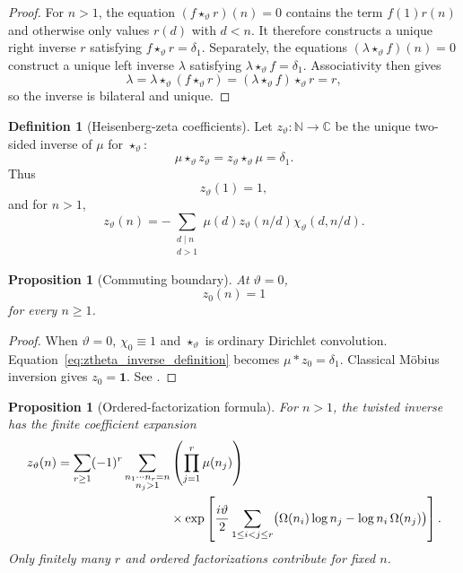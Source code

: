 \documentclass[11pt]{amsart}
\numberwithin{equation}{section}
\theoremstyle{plain}
\newtheorem{proposition}[theorem]{Proposition}
\theoremstyle{definition}
\newtheorem{definition}[theorem]{Definition}
\theoremstyle{remark}
\newcommand{\C}{\mathbb{C}}
\newcommand{\N}{\mathbb{N}}
\newcommand{\twconv}{\star_{\vartheta}}
\newcommand{\deltaone}{\delta_{1}}
\newcommand{\ellft}{\lambda}
\begin{document}
\begin{proof}
For $n>1$, the equation $(f\twconv r)(n)=0$ contains the term
$f(1)r(n)$ and otherwise only values $r(d)$ with $d<n$.  It therefore
constructs a unique right inverse $r$ satisfying $f\twconv r=\deltaone$.
Separately, the equations $(\ellft\twconv f)(n)=0$ construct a unique left
inverse $\ellft$ satisfying $\ellft\twconv f=\deltaone$.  Associativity
then gives
\begin{equation}
\ellft
=\ellft\twconv(f\twconv r)
=(\ellft\twconv f)\twconv r
=r,
\label{eq:left_right_inverse_coincide}
\end{equation}
so the inverse is bilateral and unique.
\end{proof}

\begin{definition}[Heisenberg-zeta coefficients]
\label{def:heisenberg_zeta_coefficients}
Let $z_{\vartheta}:\N\to\C$ be the unique two-sided inverse of $\mu$ for
$\twconv$:
\begin{equation}
\mu\twconv z_{\vartheta}
=
z_{\vartheta}\twconv\mu
=
\deltaone.
\label{eq:ztheta_inverse_definition}
\end{equation}
Thus
\begin{equation}
z_{\vartheta}(1)=1,
\label{eq:ztheta_one}
\end{equation}
and for $n>1$,
\begin{equation}
z_{\vartheta}(n)
=
-\sum_{\substack{d\mid n\\ d>1}}
\mu(d)z_{\vartheta}(n/d)
\chi_{\vartheta}(d,n/d).
\label{eq:ztheta_recursion}
\end{equation}
\end{definition}

\begin{proposition}[Commuting boundary]
\label{prop:commuting_boundary}
At $\vartheta=0$,
\begin{equation}
z_0(n)=1
\label{eq:z0_constant_one}
\end{equation}
for every $n\ge1$.
\end{proposition}

\begin{proof}
When $\vartheta=0$, $\chi_0\equiv1$ and $\twconv$ is ordinary Dirichlet
convolution.  Equation~\eqref{eq:ztheta_inverse_definition} becomes
$\mu*z_0=\deltaone$.  Classical M\"obius inversion gives $z_0=\mathbf1$.
See \cite{Apostol1976}.
\end{proof}

\begin{proposition}[Ordered-factorization formula]
\label{prop:ordered_factorization_formula}
For \(n>1\), the twisted inverse has the finite coefficient expansion
\begin{align}
z_\vartheta(n)
=
\sum_{r\ge1}(-1)^r
\sum_{\substack{n_1\cdots n_r=n\\ n_j>1}}
&\left(\prod_{j=1}^r\mu(n_j)\right)
\notag\\
&\times
\exp\left[
\frac{i\vartheta}{2}
\sum_{1\le i<j\le r}
\bigl(
\Omega(n_i)\log n_j-
\log n_i\,\Omega(n_j)
\bigr)
\right].
\label{eq:ordered_factorization_formula}
\end{align}
Only finitely many \(r\) and ordered factorizations contribute for fixed
\(n\).
\end{proposition}
\end{document}
